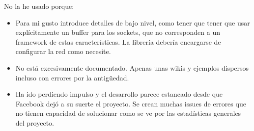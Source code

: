 No la he usado porque:
\begin{itemize}
    \item Para mi gusto introduce detalles de bajo nivel, como tener que tener que usar explícitamente un buffer para los sockets, que no corresponden a un framework de estas características. La librería debería encargarse de configurar la red como necesite.
    \item No está excesivamente documentado. Apenas unas wikis y ejemplos dispersos incluso con errores por la antigüedad.
    \item Ha ido perdiendo impulso y el desarrollo parece estancado desde que Facebook dejó a su suerte el proyecto. Se crean muchas issues de errores que no tienen capacidad de solucionar como se ve por las estadísticas generales del proyecto\cite{thriftjira}.
\end{itemize}

